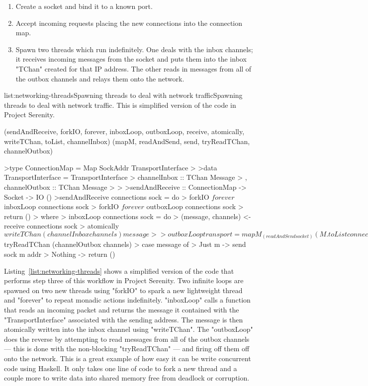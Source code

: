 \begin{enumerate}
\item Create a socket and bind it to a known port.
\item Accept incoming requests placing the new connections into the connection map.
\item Spawn two threads which run indefinitely. One deals with the inbox channels; it receives
      incoming messages from the socket and puts them into the inbox "TChan" created for that
      IP address. The other reads in messages from all of the outbox channels and relays them
      onto the network.
\end{enumerate}

\vspace{-0.5em}
\begin{listing}{list:networking-threads}{Spawning threads to deal with network traffic}{Spawning threads to deal with network traffic. This is simplified version of the code in Project Serenity.}{}
\end{listing}\vspace{-1.5em}

\functions(sendAndReceive, forkIO, forever, inboxLoop, outboxLoop, receive, atomically, writeTChan, toList, channelInbox)
\functions(mapM, readAndSend, send, tryReadTChan, channelOutbox)
\begin{haskell}
>type ConnectionMap = Map SockAddr TransportInterface
>
>data TransportInterface = TransportInterface
>  { channelInbox :: TChan Message
>  , channelOutbox :: TChan Message
>  }
>
>sendAndReceive :: ConnectionMap -> Socket -> IO ()
>sendAndReceive connections sock = do
>  forkIO $ forever $ inboxLoop connections sock
>  forkIO $ forever $ outboxLoop connections sock
>  return ()
>  where
>    inboxLoop connections sock = do
>      (message, channels) <- receive connections sock
>      atomically $ writeTChan (channelInbox channels) message
>
>    outboxLoop transport = mapM_ (readAndSend socket) (M.toList connections)
>
>    readAndSend sock (addr, channels) = do
>      message <- atomically $ tryReadTChan (channelOutbox channels)
>      case message of
>        Just m -> send sock m addr
>        Nothing -> return ()

\end{haskell}
\noindent
Listing~\ref{list:networking-threads} shows a simplified version of the code that performs
step three of this workflow in Project Serenity. Two infinite loops are spawned on two new
threads using "forkIO" to spark a new lightweight thread and "forever" to repeat monadic
actions indefinitely. "inboxLoop" calls a function that reads an incoming packet and returns
the message it contained with the "TransportInterface" associated with the sending address.
The message is then atomically written into the inbox channel using "writeTChan". The "outboxLoop"
does the reverse by attempting to read messages from all of the outbox channels --- this is
done with the non-blocking "tryReadTChan" --- and firing off them off onto the network.
This is a great example of how easy it can be write concurrent code using Haskell. It only
takes one line of code to fork a new thread and a couple more to write data into shared
memory free from deadlock or corruption.

